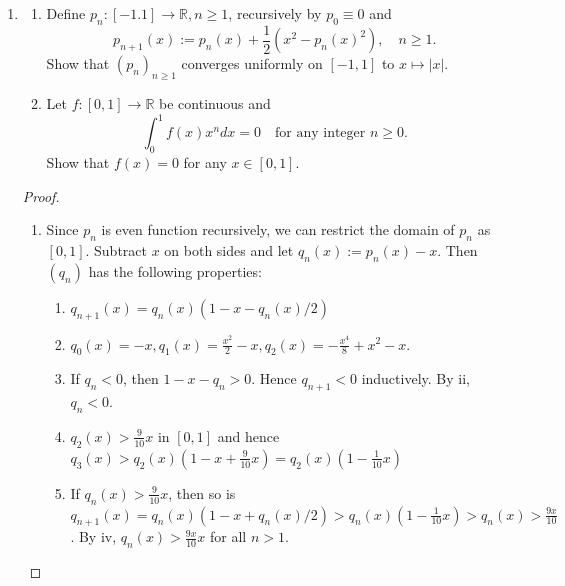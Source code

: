 \documentclass{article}
\begin{document}
\begin{enumerate}[font = \Large\bfseries\itshape\space, leftmargin = 3mm, labelsep = 3mm]
\begin{proof}
\begin{enumerate}[label = (\roman*)]
\item $f_n(x) = \cos\frac{2\pi}{n}x$
\item $f_n(x) = x + n$.
\end{enumerate}
\end{proof}

\item
\begin{enumerate}[label=(\roman*)]
\item
Define $p_n : [-1.1] \rightarrow \mathbb{R}, n \geq 1$, recursively by $p_0 \equiv 0$ and
$$p_{n+1}(x) := p_n(x) + \frac{1}{2}(x^2-p_n(x)^2), \quad n\geq 1.$$
Show that $(p_n)_{n\geq 1}$ converges uniformly on $[-1,1]$ to $x\mapsto |x|$.

\item
Let $f:[0,1]\rightarrow \mathbb{R}$ be continuous and
$$\int_0^1 f(x)x^ndx = 0 \quad \text{for any integer } n \geq 0.$$
Show that $f(x) = 0$ for any $x \in [0,1]$.
\end{enumerate}

\begin{proof}
\begin{enumerate}[label = (\roman*)]
\item
Since $p_n$ is even function recursively, we can restrict the domain of $p_n$ as $[0,1]$.
Subtract $x$ on both sides and let $q_n(x) := p_n(x) - x$.
Then $(q_n)$ has the following properties:
\begin{enumerate}
\item 
$q_{n+1}(x) = q_n(x)(1-x-q_n(x)/2)$

\item
$q_0(x) = -x, q_1(x) = \frac{x^2}{2} - x, q_2(x) = -\frac{x^4}{8} + x^2 - x$.

\item
If $q_n < 0$, then $1-x-q_n > 0$. Hence $q_{n+1} < 0$ inductively.
By ii, $q_n < 0$.

\item
$q_2(x) > \frac{9}{10}x$ in $[0,1]$ and hence $q_3(x) > q_2(x)(1-x+\frac{9}{10}x) = q_2(x)(1-\frac{1}{10}x)$

\item
If $q_n(x) > \frac{9}{10}x$, then so is $q_{n+1}(x) = q_n(x)(1-x+q_n(x)/2) > q_n(x)(1-\frac{1}{10}x) > q_n(x) > \frac{9x}{10}$.
By iv, $q_n(x) > \frac{9x}{10}x$ for all $n > 1$.
\end{enumerate}


\end{enumerate}
\end{proof}
\end{enumerate}
\end{document}
